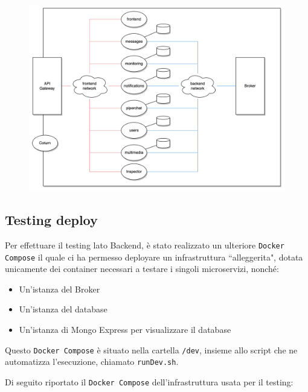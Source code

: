 \begin{figure}[H]
    \centering
    \includegraphics[width=\textwidth]{sections/06-deployment/img/microservice-deployment.jpg}
    \label{fig:architecture-deployment}
\end{figure}

%
%
%
\subsection{Testing deploy}

Per effettuare il testing lato Backend, è stato realizzato un ulteriore \texttt{Docker Compose} il quale ci ha permesso deployare un infrastruttura “alleggerita", dotata unicamente dei container necessari a testare i singoli microservizi, nonché:

\begin{itemize}
    \item Un'istanza del Broker

    \item Un'istanza del database

    \item Un'istanza di Mongo Express per visualizzare il database
\end{itemize}

Questo \texttt{Docker Compose} è situato nella cartella \texttt{/dev}, insieme allo script che ne automatizza l'esecuzione, chiamato \texttt{runDev.sh}.

Di seguito riportato il \texttt{Docker Compose} dell'infrastruttura usata per il testing:

